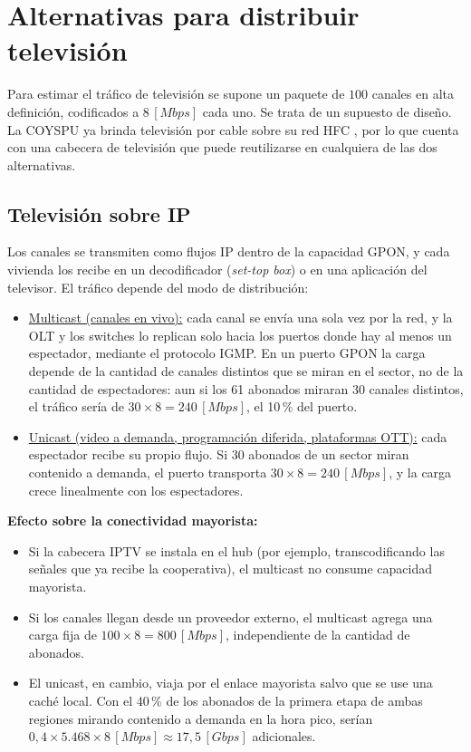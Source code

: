 \section{Alternativas para distribuir televisión}
\label{sec:television}
Para estimar el tráfico de televisión se supone un paquete de $100$ canales en alta definición, codificados a $8 \, [Mbps]$ cada uno. Se trata de un supuesto de diseño. La COYSPU ya brinda televisión por cable sobre su red HFC \cite{coyspu}, por lo que cuenta con una cabecera de televisión que puede reutilizarse en cualquiera de las dos alternativas.

\subsection{Televisión sobre IP}
\label{sec:iptv}
Los canales se transmiten como flujos IP dentro de la capacidad GPON, y cada vivienda los recibe en un decodificador (\textit{set-top box}) o en una aplicación del televisor. El tráfico depende del modo de distribución:
\begin{itemize}
    \item \underline{Multicast (canales en vivo):} cada canal se envía una sola vez por la red, y la OLT y los switches lo replican solo hacia los puertos donde hay al menos un espectador, mediante el protocolo IGMP. En un puerto GPON la carga depende de la cantidad de canales distintos que se miran en el sector, no de la cantidad de espectadores: aun si los 61 abonados miraran 30 canales distintos, el tráfico sería de $30 \times 8 = 240 \, [Mbps]$, el 10\,\% del puerto.
    \item \underline{Unicast (video a demanda, programación diferida, plataformas OTT):} cada espectador recibe su propio flujo. Si 30 abonados de un sector miran contenido a demanda, el puerto transporta $30 \times 8 = 240 \, [Mbps]$, y la carga crece linealmente con los espectadores.
\end{itemize}

\textbf{Efecto sobre la conectividad mayorista:}
\begin{itemize}
    \item Si la cabecera IPTV se instala en el hub (por ejemplo, transcodificando las señales que ya recibe la cooperativa), el multicast no consume capacidad mayorista.
    \item Si los canales llegan desde un proveedor externo, el multicast agrega una carga fija de $100 \times 8 = 800 \, [Mbps]$, independiente de la cantidad de abonados.
    \item El unicast, en cambio, viaja por el enlace mayorista salvo que se use una caché local. Con el 40\,\% de los abonados de la primera etapa de ambas regiones mirando contenido a demanda en la hora pico, serían $0{,}4 \times 5.468 \times 8 \, [Mbps] \approx 17{,}5 \, [Gbps]$ adicionales.
\end{itemize}

